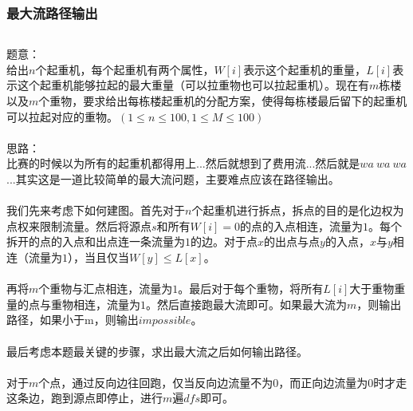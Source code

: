 \documentclass[twoside]{article}
\begin{document}
\subsubsection{最大流路径输出}
\begin{lstlisting}
\end{lstlisting}
题意：\\
给出$n$个起重机，每个起重机有两个属性，$W[i]$表示这个起重机的重量，$L[i]$表示这个起重机能够拉起的最大重量（可以拉重物也可以拉起重机）。现在有$m$栋楼以及$m$个重物，要求给出每栋楼起重机的分配方案，使得每栋楼最后留下的起重机可以拉起对应的重物。$(1\leq n\leq 100, 1\leq M\leq 100)$\\
\\
思路：\\
比赛的时候以为所有的起重机都得用上...然后就想到了费用流...然后就是$wa\ wa\ wa$...其实这是一道比较简单的最大流问题，主要难点应该在路径输出。\\
\\
我们先来考虑下如何建图。首先对于$n$个起重机进行拆点，拆点的目的是化边权为点权来限制流量。然后将源点$s$和所有$W[i]=0$的点的入点相连，流量为$1$。每个拆开的点的入点和出点连一条流量为$1$的边。对于点$x$的出点与点$y$的入点，$x$与$y$相连（流量为$1$），当且仅当$W[y]\leq L[x]$。\\
\\
再将$m$个重物与汇点相连，流量为$1$。最后对于每个重物，将所有$L[i]$大于重物重量的点与重物相连，流量为$1$。然后直接跑最大流即可。如果最大流为$m$，则输出路径，如果小于m，则输出$impossible$。\\
\\
最后考虑本题最关键的步骤，求出最大流之后如何输出路径。\\
\\
对于$m$个点，通过反向边往回跑，仅当反向边流量不为$0$，而正向边流量为$0$时才走这条边，跑到源点即停止，进行$m$遍$dfs$即可。\\
\end{document}
